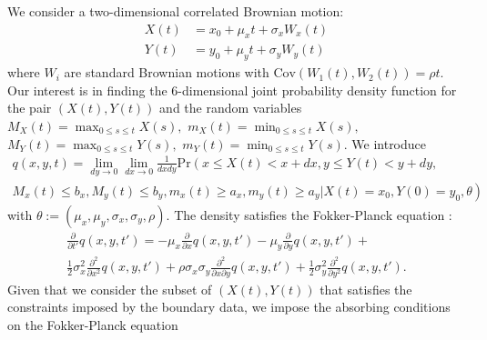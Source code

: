 We consider a two-dimensional correlated Brownian motion:
\begin{align}
  X(t) &= x_0 + \mu_x t + \sigma_x W_x(t)  \label{eq:X} \\
  Y(t) &= y_0 + \mu_y t + \sigma_y W_y(t)  \label{eq:Y}
\end{align}
where $W_i$ are standard Brownian motions with
$\mbox{Cov}(W_1(t), W_2(t)) = \rho t$. Our interest is in finding the
6-dimensional joint probability density function for the pair $(X(t), Y(t))$
and the random variables $M_X(t)=\max_{0\leq s\leq t}X(s),$
$m_X(t)=\min_{0\leq s\leq t}X(s),$ $M_Y(t)=\max_{0\leq s\leq t}Y(s),$
$m_Y(t)=\min_{0\leq s\leq t}Y(s)$. We introduce
\begin{multline}
  q(x,y,t) = \lim_{dy \to 0} \lim_{dx \to 0} \frac{1}{dx dy} \mbox{Pr}\left(x \leq X(t) < x+dx, y \leq Y(t) < y+dy, \right. \\
  \left. M_x(t) \leq b_x, M_y(t) \leq b_y, m_x(t) \geq a_x, m_y(t) \geq a_y | X(t) = x_0, Y(0) = y_0,
  \theta \right) \label{eq:CDF}
\end{multline}
with $\theta := (\mu_x, \mu_y, \sigma_x, \sigma_y, \rho).$ %
The density satisfies the Fokker-Planck equation
\citep{oksendal2013stochastic}:
\begin{multline}
  \displaystyle \frac{\partial}{\partial t'} q(x,y,t') = -\mu_x \frac{\partial}{\partial x}q(x,y,t')
  - \mu_y \frac{\partial}{\partial y}q(x,y,t') + \\
  \frac{1}{2}\sigma_x^2 \frac{\partial^2}{\partial x^2}q(x,y,t') + \rho\sigma_x\sigma_y \frac{\partial^2}{\partial x \partial y}q(x,y,t')
  + \frac{1}{2}\sigma_y^2 \frac{\partial^2}{\partial y^2}q(x,y,t'). \label{eq:1}
\end{multline}
Given that we consider the subset of $(X(t), Y(t))$ that satisfies the constraints imposed by the boundary data, we impose the absorbing conditions on the Fokker-Planck equation
